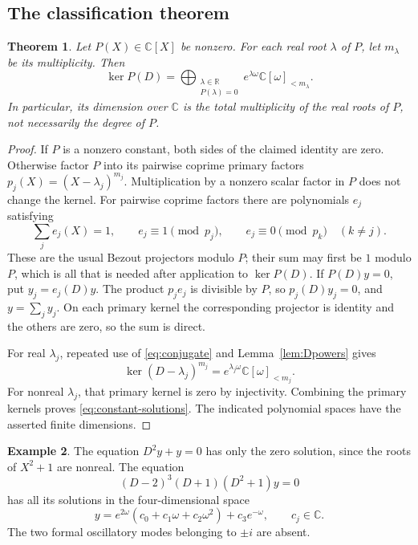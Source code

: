 \documentclass[11pt,a4paper]{article}
\numberwithin{equation}{section}
\newtheorem{theorem}{Theorem}[section]
\theoremstyle{definition}
\newtheorem{example}[theorem]{Example}
\theoremstyle{remark}
\newcommand{\C}{\mathbb C}
\newcommand{\R}{\mathbb R}
\begin{document}
\subsection{The classification theorem}

\begin{theorem}\label{thm:constant-ODE}
Let $P(X)\in\C[X]$ be nonzero. For each real root $\lambda$ of $P$, let
$m_\lambda$ be its multiplicity. Then
\begin{equation}\label{eq:constant-solutions}
 \ker P(D)=
 \bigoplus_{\substack{\lambda\in\R\\P(\lambda)=0}}
 e^{\lambda\omega}\C[\omega]_{<m_\lambda}.
\end{equation}
In particular, its dimension over $\C$ is the total multiplicity of the
\emph{real} roots of $P$, not necessarily the degree of $P$.
\end{theorem}
\begin{proof}
If $P$ is a nonzero constant, both sides of the claimed identity are zero.
Otherwise factor $P$ into its pairwise coprime primary factors
$p_j(X)=(X-\lambda_j)^{m_j}$. Multiplication by a nonzero scalar factor
in $P$ does not change the kernel. For pairwise coprime factors there are
polynomials $e_j$ satisfying
\[
 \sum_j e_j(X)=1,\qquad
 e_j\equiv1\pmod{p_j},\qquad
 e_j\equiv0\pmod{p_k}\quad(k\ne j).
\]
These are the usual Bezout projectors modulo $P$; their sum may first be
$1$ modulo $P$, which is all that is needed after application to $\ker P(D)$.
If $P(D)y=0$, put $y_j=e_j(D)y$. The product $p_j e_j$ is divisible by
$P$, so $p_j(D)y_j=0$, and $y=\sum_jy_j$. On each primary kernel the
corresponding projector is identity and the others are zero, so the sum is
direct.

For real $\lambda_j$, repeated use of \eqref{eq:conjugate} and
Lemma~\ref{lem:Dpowers} gives
\[
 \ker(D-\lambda_j)^{m_j}
 =e^{\lambda_j\omega}\C[\omega]_{<m_j}.
\]
For nonreal $\lambda_j$, that primary kernel is zero by injectivity.
Combining the primary kernels proves \eqref{eq:constant-solutions}.
The indicated polynomial spaces have the asserted finite dimensions.
\end{proof}

\begin{example}
The equation $D^2y+y=0$ has only the zero solution, since the roots of
$X^2+1$ are nonreal. The equation
\[
 (D-2)^3(D+1)(D^2+1)y=0
\]
has all its solutions in the four-dimensional space
\[
 y=e^{2\omega}(c_0+c_1\omega+c_2\omega^2)+c_3e^{-\omega},
 \qquad c_j\in\C.
\]
The two formal oscillatory modes belonging to $\pm i$ are absent.
\end{example}
\end{document}
